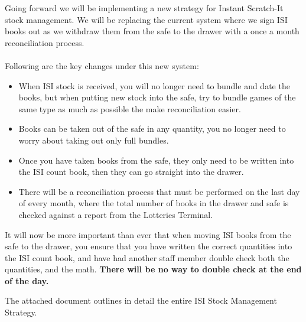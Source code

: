 \documentclass[a4paper,11pt]{texMemo}
\begin{document}
\maketitle

Going forward we will be implementing a new strategy for Instant Scratch-It stock management. We will be replacing the current system where we sign ISI books out as we withdraw them from the safe to the drawer with a once a month reconciliation process.
\\
\\
Following are the key changes under this new system:
\begin{itemize}
    \item When ISI stock is received, you will no longer need to bundle and date the books, but when putting new stock into the safe, try to bundle games of the same type as much as possible the make reconciliation easier.
    \item Books can be taken out of the safe in any quantity, you no longer need to worry about taking out only full bundles.
    \item Once you have taken books from the safe, they only need to be written into the ISI count book, then they can go straight into the drawer.
    \item There will be a reconciliation process that must be performed on the last day of every month, where the total number of books in the drawer and safe is checked against a report from the Lotteries Terminal.
\end{itemize}

It will now be more important than ever that when moving ISI books from the safe to the drawer, you ensure that you have written the correct quantities into the ISI count book, and have had another staff member double check both the quantities, and the math. \color{red}\textbf{There will be no way to double check at the end of the day.} \color{black}
\\
\par
The attached document outlines in detail the entire ISI Stock Management Strategy.
\end{document}
